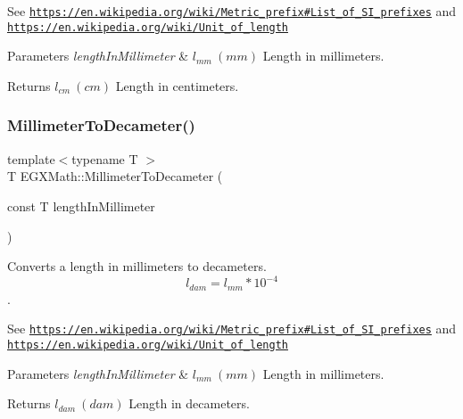 See \href{https://en.wikipedia.org/wiki/Metric_prefix#List_of_SI_prefixes}{\tt https\+://en.\+wikipedia.\+org/wiki/\+Metric\+\_\+prefix\#\+List\+\_\+of\+\_\+\+S\+I\+\_\+prefixes} and \href{https://en.wikipedia.org/wiki/Unit_of_length}{\tt https\+://en.\+wikipedia.\+org/wiki/\+Unit\+\_\+of\+\_\+length} 
\begin{DoxyParams}{Parameters}
{\em length\+In\+Millimeter} & $ l_{mm}\ (mm)$ Length in millimeters. \\
\hline
\end{DoxyParams}
\begin{DoxyReturn}{Returns}
$ l_{cm}\ (cm)$ Length in centimeters. 
\end{DoxyReturn}
\mbox{\label{group___e_g_x_math-_conversions-_length_conversions-_s_i-_millimeter-_s_i_gaf0e54830f6ae997dde95341e87638bf5}} 
\subsubsection{\texorpdfstring{Millimeter\+To\+Decameter()}{MillimeterToDecameter()}}
{\footnotesize\ttfamily template$<$typename T $>$ \\
T E\+G\+X\+Math\+::\+Millimeter\+To\+Decameter (\begin{DoxyParamCaption}\item[{const T}]{length\+In\+Millimeter }\end{DoxyParamCaption})}



Converts a length in millimeters to decameters. \[ l_{dam}=l_{mm} * 10^{-4} \]. 

See \href{https://en.wikipedia.org/wiki/Metric_prefix#List_of_SI_prefixes}{\tt https\+://en.\+wikipedia.\+org/wiki/\+Metric\+\_\+prefix\#\+List\+\_\+of\+\_\+\+S\+I\+\_\+prefixes} and \href{https://en.wikipedia.org/wiki/Unit_of_length}{\tt https\+://en.\+wikipedia.\+org/wiki/\+Unit\+\_\+of\+\_\+length} 
\begin{DoxyParams}{Parameters}
{\em length\+In\+Millimeter} & $ l_{mm}\ (mm)$ Length in millimeters. \\
\hline
\end{DoxyParams}
\begin{DoxyReturn}{Returns}
$ l_{dam}\ (dam)$ Length in decameters. 
\end{DoxyReturn}
\mbox{\label{group___e_g_x_math-_conversions-_length_conversions-_s_i-_millimeter-_s_i_gad38e2be59f56a27e7628cfcbaa4a7df2}} 
